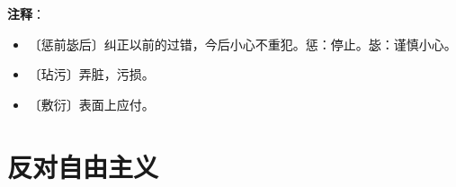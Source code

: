 \documentclass[12pt,UTF-8,openany]{ctexbook}
\begin{document}
\newpage

\textbf{注释}：

\vspace{-1em}

\begin{itemize}
    \setlength\itemsep{-0.2em}
    \item 〔惩前毖后〕纠正以前的过错，今后小心不重犯。惩：停止。毖：谨慎小心。
    \item 〔玷污〕弄脏，污损。
    \item 〔敷衍〕表面上应付。
\end{itemize}

\chapter{反对自由主义}
\end{document}
